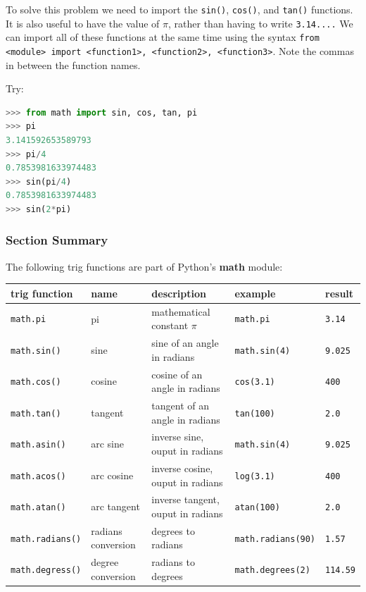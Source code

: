 \documentclass{book}
\begin{document}
To solve this problem we need to import the \lstinline!sin()!,
\lstinline!cos()!, and \lstinline!tan()! functions. It is also useful to
have the value of \(\pi\), rather than having to write
\lstinline!3.14....! We can import all of these functions at the same
time using the syntax
\lstinline!from <module> import <function1>, <function2>, <function3>!.
Note the commas in between the function names.

Try:

\begin{lstlisting}[language=Python]
>>> from math import sin, cos, tan, pi
>>> pi
3.141592653589793
>>> pi/4
0.7853981633974483
>>> sin(pi/4)
0.7853981633974483
>>> sin(2*pi)
\end{lstlisting}
    




    
        \subsubsection{Section Summary}\label{section-summary}

The following trig functions are part of Python's \textbf{math} module:

\begin{longtable}[]{@{}lllll@{}}
\toprule
trig function & name & description & example & result\tabularnewline
\midrule
\endhead
\lstinline!math.pi! & pi & mathematical constant \(\pi\) &
\lstinline!math.pi! & \lstinline!3.14!\tabularnewline
\lstinline!math.sin()! & sine & sine of an angle in radians &
\lstinline!math.sin(4)! & \lstinline!9.025!\tabularnewline
\lstinline!math.cos()! & cosine & cosine of an angle in radians &
\lstinline!cos(3.1)! & \lstinline!400!\tabularnewline
\lstinline!math.tan()! & tangent & tangent of an angle in radians &
\lstinline!tan(100)! & \lstinline!2.0!\tabularnewline
\lstinline!math.asin()! & arc sine & inverse sine, ouput in radians &
\lstinline!math.sin(4)! & \lstinline!9.025!\tabularnewline
\lstinline!math.acos()! & arc cosine & inverse cosine, ouput in radians
& \lstinline!log(3.1)! & \lstinline!400!\tabularnewline
\lstinline!math.atan()! & arc tangent & inverse tangent, ouput in
radians & \lstinline!atan(100)! & \lstinline!2.0!\tabularnewline
\lstinline!math.radians()! & radians conversion & degrees to radians &
\lstinline!math.radians(90)! & \lstinline!1.57!\tabularnewline
\lstinline!math.degress()! & degree conversion & radians to degrees &
\lstinline!math.degrees(2)! & \lstinline!114.59!\tabularnewline
\bottomrule
\end{longtable}
    
\end{document}
